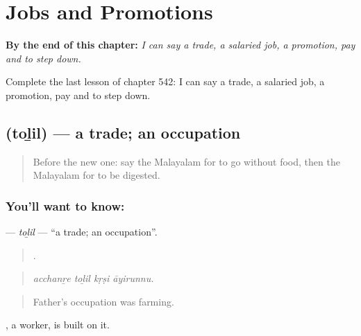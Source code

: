 
\chapter{Jobs and Promotions}
\label{ch:ml-jobs-and-promotions}

\begin{chapteropening}
\textbf{By the end of this chapter:} \emph{I can say a trade, a salaried job, a promotion, pay and to step down.}

Complete the last lesson of chapter 542: I can say a trade, a salaried job, a promotion, pay and to step down.
\end{chapteropening}

\section[\texorpdfstring{\ml{തൊഴിൽ} (toḻil)}{തൊഴിൽ (toḻil)}]{ (toḻil) — a trade; an occupation}

\label{lesson:ML-C542-tolil}



\begin{quote}
Before the new one: say the Malayalam for to go without food, then the Malayalam for to be digested.
\end{quote}

\subsection*{You'll want to know: }
\textbf{} — \emph{toḻil} — \textquotedblleft{}a trade; an occupation\textquotedblright{}.

\begin{quote}
   .
\end{quote}

\begin{quote}
\emph{acchanṟe toḻil kṛṣi āyirunnu.}
\end{quote}

\begin{quote}
Father's occupation was farming.
\end{quote}

, a worker, is built on it.

